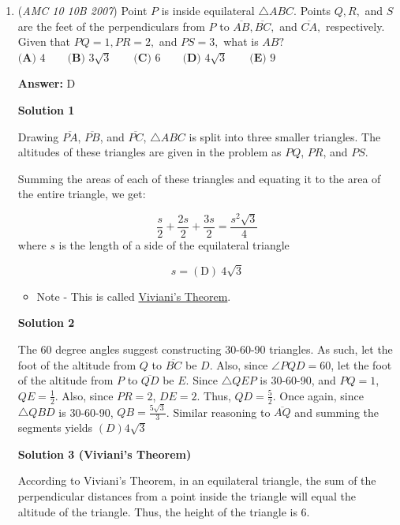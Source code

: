 \begin{enumerate}
	\item (\textit{AMC 10 10B 2007}) Point $P$ is inside equilateral $\triangle ABC.$ Points $Q, R,$ and $S$ are the feet of the perpendiculars from $P$ to $\overline{AB}, \overline{BC},$ and $\overline{CA},$ respectively. Given that $PQ=1, PR=2,$ and $PS=3,$ what is $AB?$
$\textbf{(A) } 4 \qquad\textbf{(B) } 3\sqrt{3} \qquad\textbf{(C) } 6 \qquad\textbf{(D) } 4\sqrt{3} \qquad\textbf{(E) } 9$

 \textbf{Answer: }D



\textbf{Solution 1}

Drawing $\overline{PA}$, $\overline{PB}$, and $\overline{PC}$, $\triangle ABC$ is split into three smaller triangles. The altitudes of these triangles are given in the problem as $PQ$, $PR$, and $PS$.

 Summing the areas of each of these triangles and equating it to the area of the entire triangle, we get:

 
 \[\frac{s}{2} + \frac{2s}{2} + \frac{3s}{2} = \frac{s^2\sqrt{3}}{4}\]where $s$ is the length of a side of the equilateral triangle

 
 \[s = \boxed{\mathrm{(D) \ } 4\sqrt{3}}\]

            \begin{itemize}
        \item Note - This is called \href{https://artofproblemsolving.com/wiki/index.php?title=Viviani\%27s\_Theorem}{Viviani's Theorem}.
            \end{itemize}
            



\textbf{Solution 2}

The 60 degree angles suggest constructing 30-60-90 triangles. As such, let the foot of the altitude from $Q$ to $\overline{BC}$ be $D$. Also, since $\angle{PQD}=60$, let the foot of the altitude from $P$ to $\overline{QD}$ be $E$. Since $\triangle{QEP}$ is 30-60-90, and $PQ=1$, $QE=\frac{1}{2}$. Also, since $PR=2$, $DE=2$. Thus, $QD=\frac{5}{2}$. Once again, since $\triangle{QBD}$ is 30-60-90, $QB=\frac{5\sqrt{3}}{3}$. Similar reasoning to $\overline{AQ}$ and summing the segments yields $\boxed{(D) 4\sqrt{3}}$




\textbf{Solution 3 (Viviani's Theorem)}

According to Viviani's Theorem, in an equilateral triangle, the sum of the perpendicular distances from a point inside the triangle will equal the altitude of the triangle. Thus, the height of the triangle is 6. 


\end{enumerate}
